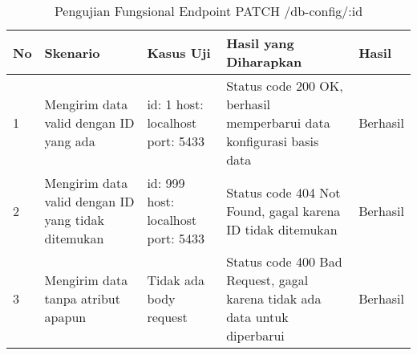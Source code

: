 \begin{table}[H]
    \centering
    \begin{tabular}{|p{0.5cm}|p{3cm}|p{5cm}|p{5cm}|p{1.5cm}|}
        \hline
        \rowcolor[HTML]{DAE8FC} 
        \textbf{No} & \textbf{Skenario} & \textbf{Kasus Uji} & \textbf{Hasil yang Diharapkan} & \textbf{Hasil} \\ \hline
        1 & Mengirim data valid dengan ID yang ada & 
        id: 1 \newline host: localhost \newline port: 5433 & 
        Status code 200 OK, berhasil memperbarui data konfigurasi basis data & 
        Berhasil \\ \hline
        2 & Mengirim data valid dengan ID yang tidak ditemukan & 
        id: 999 \newline host: localhost \newline port: 5433 & 
        Status code 404 Not Found, gagal karena ID tidak ditemukan & 
        Berhasil \\ \hline
        3 & Mengirim data tanpa atribut apapun & 
        Tidak ada body request & 
        Status code 400 Bad Request, gagal karena tidak ada data untuk diperbarui & 
        Berhasil \\ \hline
    \end{tabular}
    \caption{Pengujian Fungsional Endpoint PATCH /db-config/:id}
    \label{tab:db_config_patch_testing}
\end{table}
